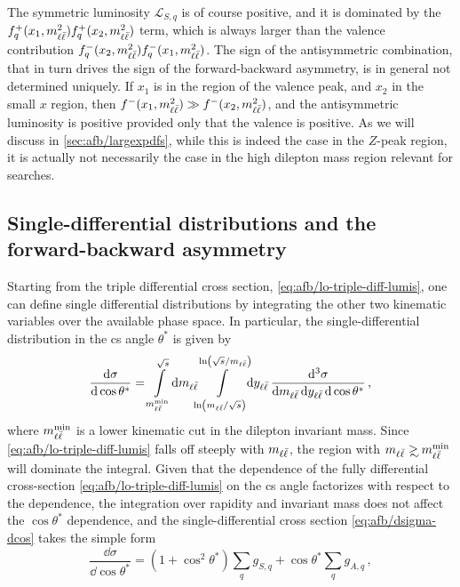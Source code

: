 The symmetric luminosity $\mathcal{L}_{S,q}$ is of course positive, and it is
dominated by the $f_q^+(x_1,m_{\ell\bar{\ell}}^2) f_{q}^+(x_2,m_{\ell\bar{\ell}}^2)$ term, which is always
larger than the valence contribution  $f_q^-(x_2,m_{\ell\bar{\ell}}^2) f_{q}^-(x_1,m_{\ell\bar{\ell}}^2)$.
The sign of the antisymmetric combination, that in turn drives the sign of the
forward-backward asymmetry, is in general not determined uniquely.
%
If $x_1$ is in the region of the valence peak, and $x_2$ in the small $x$
region, then $f^-(x_1,m_{\ell\bar{\ell}}^2)\gg f^-(x_2,m_{\ell\bar{\ell}}^2)$, and the antisymmetric
luminosity is positive provided only that the valence \pdf is positive.
%
As we will discuss in \cref{sec:afb/largexpdfs},
while this is indeed the case in
the $Z$-peak region, it is actually not necessarily the case in the
high dilepton mass region relevant for \bsm searches.

\subsection{Single-differential distributions and the forward-backward asymmetry}
\label{sec:afb/numlo}
Starting from the triple differential cross section,
\cref{eq:afb/lo-triple-diff-lumis}, one can define 
single differential distributions by integrating the other two kinematic variables
over the available phase space.
%
In particular, the single-differential distribution in the
\acrlong{cs} angle $\theta^*$ is given by
\begin{equation}
  \label{eq:afb/dsigma-dcos}
  \frac{\dd\sigma}{\dd\cos\theta^*} = \int\limits_{m_{\ell\bar{\ell}}^{\text{min}}}^{\sqrt s}\!\dd m_{\ell\bar{\ell}}\!\!\int\limits_{\ln(m_{\ell\bar{\ell}}/\sqrt s)}^{\ln(\sqrt s/m_{\ell\bar{\ell}})}\!\!\dd y_{\ell\bar{\ell}}\, \frac{\dd^3 \sigma}{\dd m_{\ell\bar{\ell}} \, \dd y_{\ell\bar{\ell}} \, \dd\cos\theta^*} \, ,
\end{equation}
where $m_{\ell\bar{\ell}}^{\text{min}}$ is a lower kinematic cut in the dilepton invariant mass.
%
Since \cref{eq:afb/lo-triple-diff-lumis} falls off steeply with $m_{\ell\bar{\ell}}$, the region
with $\mll \gsim \mll^{\text{min}}$ will dominate the integral.
%
Given that the dependence of the fully differential cross-section
\cref{eq:afb/lo-triple-diff-lumis}
on  the \acrlong{cs} angle factorizes with respect to the \pdf
dependence, the integration over rapidity and invariant mass does not
affect the  $\cos\theta^*$ dependence, and the single-differential
cross section \cref{eq:afb/dsigma-dcos} takes the simple form 
\begin{equation}
  \label{eq:afb/dsigma-dcos-v2}
  \frac{\dd\sigma}{\dd\cos\theta^*} = (1+\cos^2\theta^*)\sum_q g_{S,q} + \cos\theta^*\sum_q g_{A,q} \, ,
\end{equation}
